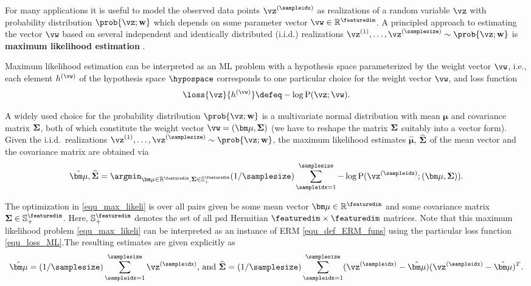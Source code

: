 \documentclass[12pt]{report}
\newcommand{\featurelen}{\featuredim}
\begin{document}
For many applications it is useful to model the observed data points $\vz^{(\sampleidx)}$ 
as realizations of a random variable $\vz$ with probability distribution $\prob{\vz; \mathbf{w}}$ 
which depends on some parameter vector $\vw \in \mathbb{R}^{\featuredim}$. A principled 
approach to estimating the vector $\vw$ based on several independent and identically 
distributed (i.i.d.) realizations $\vz^{(1)},\ldots,\vz^{(\samplesize)}\sim \prob{\vz; \mathbf{w}}$ is 
{\bf maximum likelihood estimation} \cite{LC}. 

Maximum likelihood estimation can be interpreted as an ML problem with a hypothesis space 
parameterized by the weight vector $\vw$, i.e., each element $h^{(\vw)}$ of the hypothesis 
space $\hypospace$ corresponds to one particular choice for the 
weight vector $\vw$, and loss function 
\begin{equation} 
\label{equ_loss_ML}
\loss{\vz}{h^{(\vw)}} \defeq - \log {\rm P} (\vz; \vw). 
\end{equation} 

A widely used choice for the probability distribution $\prob{\vz; \mathbf{w}}$ is a multivariate normal 
distribution with mean ${\bm \mu}$ and covariance matrix ${\bf \Sigma}$, both of which constitute the 
weight vector $\vw = ({\bm \mu}, {\bf \Sigma})$ (we have to reshape the matrix ${\bf \Sigma}$ suitably 
into a vector form). Given the i.i.d.\ realizations $\vz^{(1)},\ldots,\vz^{(\samplesize)} \sim \prob{\vz; \mathbf{w}}$,  
the maximum likelihood estimates $\hat{\bm \mu}$, $\widehat{\bf \Sigma}$ of the mean vector and 
the covariance matrix are obtained via 
\begin{equation}
\label{equ_max_likeli}
\hat{\bm \mu}, \widehat{\bf \Sigma} = \argmin_{{\bm \mu} \in \mathbb{R}^{\featurelen},{\bf \Sigma} \in \mathbb{S}^{\featurelen}_{+}} (1/\samplesize) \sum_{\sampleidx=1}^{\samplesize} - \log {\rm P} (\vz^{(\sampleidx)}; ({\bm \mu},{\bf \Sigma})). 
\end{equation} 

The optimization in \eqref{equ_max_likeli} is over all pairs given be some mean 
vector ${\bm \mu} \in \mathbb{R}^{\featurelen}$ and some covariance matrix ${\bf \Sigma} \in \mathbb{S}^{\featurelen}_{+}$. Here, $\mathbb{S}^{\featurelen}_{+}$ denotes the set of all psd Hermitian $\featurelen \times \featurelen$ matrices. 
Note that this maximum likelihood problem \eqref{equ_max_likeli} can be 
interpreted as an instance of ERM \eqref{equ_def_ERM_funs} using the 
particular loss function \eqref{equ_loss_ML}.The resulting estimates are 
given explicitly as 
\begin{equation}
\label{equ_ML_mean_cov_Gauss} 
\hat{\bm \mu} = (1/\samplesize) \sum_{\sampleidx=1}^{\samplesize} \vz^{(\sampleidx)} \mbox{, and } \widehat{\bf \Sigma} = (1/\samplesize) \sum_{\sampleidx=1}^{\samplesize} (\vz^{(\sampleidx)} - \hat{\bm \mu})(\vz^{(\sampleidx)} - \hat{\bm \mu})^{T}.
\end{equation} 
\end{document}
